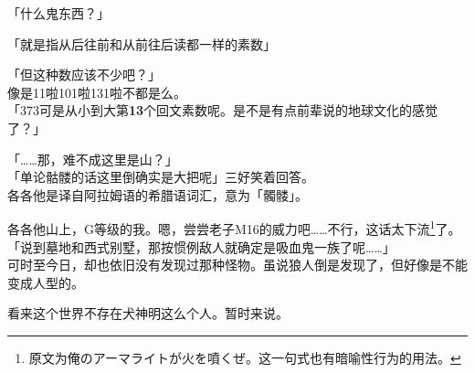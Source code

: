 「什么鬼东西？」

「就是指从后往前和从前往后读都一样的素数」

「但这种数应该不少吧？」\\

像是11啦101啦131啦不都是么。\\

「373可是从小到大第\textbf{13}个回文素数呢。是不是有点前辈说的地球文化的感觉了？」

「……那，难不成这里是山？」\\

「单论骷髅的话这里倒确实是大把呢」三好笑着回答。\\

各各他是译自阿拉姆语的希腊语词汇，意为「髑髅」。

各各他山上，G等级的我。嗯，尝尝老子M16的威力吧……不行，这话太下流\footnote{原文为俺のアーマライトが火を噴くぜ。这一句式也有暗喻性行为的用法。}了。\\

「说到墓地和西式别墅，那按惯例敌人就确定是吸血鬼一族了呢……」\\

可时至今日，却也依旧没有发现过那种怪物。虽说狼人倒是发现了，但好像是不能变成人型的。

看来这个世界不存在犬神明这么个人。暂时来说。\\


